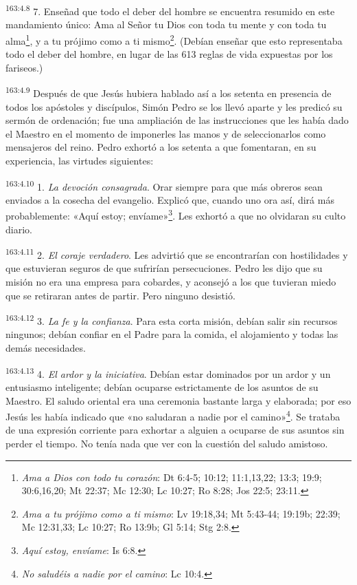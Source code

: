 \par
\textsuperscript{163:4.8} 7. Enseñad que todo el deber del hombre se encuentra resumido en este mandamiento único: Ama al Señor tu Dios con toda tu mente y con toda tu alma\footnote{\textit{Ama a Dios con todo tu corazón}: Dt 6:4-5; 10:12; 11:1,13,22; 13:3; 19:9; 30:6,16,20; Mt 22:37; Mc 12:30; Lc 10:27; Ro 8:28; Jos 22:5; 23:11.}, y a tu prójimo como a ti mismo\footnote{\textit{Ama a tu prójimo como a ti mismo}: Lv 19:18,34; Mt 5:43-44; 19:19b; 22:39; Mc 12:31,33; Lc 10:27; Ro 13:9b; Gl 5:14; Stg 2:8.}. (Debían enseñar que esto representaba todo el deber del hombre, en lugar de las 613 reglas de vida expuestas por los fariseos.)

\par
\textsuperscript{163:4.9} Después de que Jesús hubiera hablado así a los setenta en presencia de todos los apóstoles y discípulos, Simón Pedro se los llevó aparte y les predicó su sermón de ordenación; fue una ampliación de las instrucciones que les había dado el Maestro en el momento de imponerles las manos y de seleccionarlos como mensajeros del reino. Pedro exhortó a los setenta a que fomentaran, en su experiencia, las virtudes siguientes:

\par
\textsuperscript{163:4.10} 1. \textit{La devoción consagrada}. Orar siempre para que más obreros sean enviados a la cosecha del evangelio. Explicó que, cuando uno ora así, dirá más probablemente: «Aquí estoy; envíame»\footnote{\textit{Aquí estoy, envíame}: Is 6:8.}. Les exhortó a que no olvidaran su culto diario.

\par
\textsuperscript{163:4.11} 2. \textit{El coraje verdadero}. Les advirtió que se encontrarían con hostilidades y que estuvieran seguros de que sufrirían persecuciones. Pedro les dijo que su misión no era una empresa para cobardes, y aconsejó a los que tuvieran miedo que se retiraran antes de partir. Pero ninguno desistió.

\par
\textsuperscript{163:4.12} 3. \textit{La fe y la confianza}. Para esta corta misión, debían salir sin recursos ningunos; debían confiar en el Padre para la comida, el alojamiento y todas las demás necesidades.

\par
\textsuperscript{163:4.13} 4. \textit{El ardor y la iniciativa}. Debían estar dominados por un ardor y un entusiasmo inteligente; debían ocuparse estrictamente de los asuntos de su Maestro. El saludo oriental era una ceremonia bastante larga y elaborada; por eso Jesús les había indicado que «no saludaran a nadie por el camino»\footnote{\textit{No saludéis a nadie por el camino}: Lc 10:4.}. Se trataba de una expresión corriente para exhortar a alguien a ocuparse de sus asuntos sin perder el tiempo. No tenía nada que ver con la cuestión del saludo amistoso.

